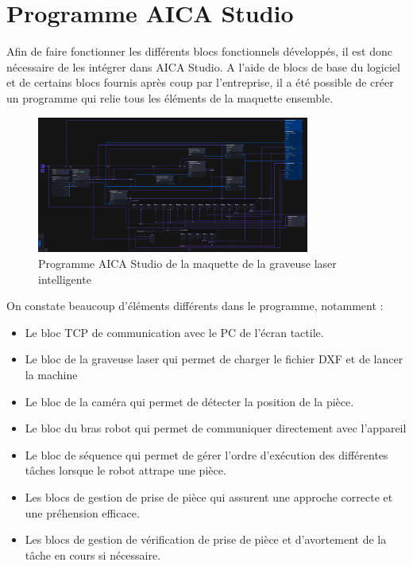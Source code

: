 \section{Programme AICA Studio}
Afin de faire fonctionner les différents blocs fonctionnels développés, il est donc nécessaire de les intégrer dans AICA Studio. A l'aide de blocs de base du logiciel et de certains blocs fournis après coup par l'entreprise, il a été possible de créer un programme qui relie tous les éléments de la maquette ensemble.
\begin{figure}[H]
    \centering
    \includegraphics[width=0.8\textwidth]{assets/figures/AICA_main_app.png}
    \caption{Programme AICA Studio de la maquette de la graveuse laser intelligente}
    \label{fig:aica_programme}
\end{figure}

On constate beaucoup d'éléments différents dans le programme, notamment :
\begin{itemize}
    \item Le bloc TCP de communication avec le PC de l'écran tactile.
    \item Le bloc de la graveuse laser qui permet de charger le fichier DXF et de lancer la machine
    \item Le bloc de la caméra qui permet de détecter la position de la pièce.
    \item Le bloc du bras robot qui permet de communiquer directement avec l'appareil
    \item Le bloc de séquence qui permet de gérer l'ordre d'exécution des différentes tâches lorsque le robot attrape une pièce.
    \item Les blocs de gestion de prise de pièce qui assurent une approche correcte et une préhension efficace.
    \item Les blocs de gestion de vérification de prise de pièce et d'avortement de la tâche en cours si nécessaire.
\end{itemize}

